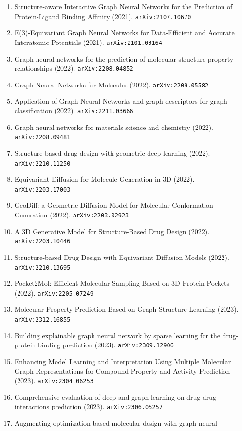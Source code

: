 \documentclass[11pt]{article}
\begin{document}
\begin{enumerate}
  \item Structure-aware Interactive Graph Neural Networks for the Prediction of
  Protein-Ligand Binding Affinity (2021). \texttt{arXiv:2107.10670}
  \item E(3)-Equivariant Graph Neural Networks for Data-Efficient and Accurate
  Interatomic Potentials (2021). \texttt{arXiv:2101.03164}
  \item Graph neural networks for the prediction of molecular structure-property
  relationships (2022). \texttt{arXiv:2208.04852}
  \item Graph Neural Networks for Molecules (2022). \texttt{arXiv:2209.05582}
  \item Application of Graph Neural Networks and graph descriptors for graph
  classification (2022). \texttt{arXiv:2211.03666}
  \item Graph neural networks for materials science and chemistry (2022). \texttt{arXiv:2208.09481}
  \item Structure-based drug design with geometric deep learning (2022). \texttt{arXiv:2210.11250}
  \item Equivariant Diffusion for Molecule Generation in 3D (2022). \texttt{arXiv:2203.17003}
  \item GeoDiff: a Geometric Diffusion Model for Molecular Conformation
  Generation (2022). \texttt{arXiv:2203.02923}
  \item A 3D Generative Model for Structure-Based Drug Design (2022). \texttt{arXiv:2203.10446}
  \item Structure-based Drug Design with Equivariant Diffusion Models (2022). \texttt{arXiv:2210.13695}
  \item Pocket2Mol: Efficient Molecular Sampling Based on 3D Protein Pockets (2022). \texttt{arXiv:2205.07249}
  \item Molecular Property Prediction Based on Graph Structure Learning (2023). \texttt{arXiv:2312.16855}
  \item Building explainable graph neural network by sparse learning for the
  drug-protein binding prediction (2023). \texttt{arXiv:2309.12906}
  \item Enhancing Model Learning and Interpretation Using Multiple Molecular
  Graph Representations for Compound Property and Activity Prediction (2023). \texttt{arXiv:2304.06253}
  \item Comprehensive evaluation of deep and graph learning on drug-drug
  interactions prediction (2023). \texttt{arXiv:2306.05257}
  \item Augmenting optimization-based molecular design with graph neural

\end{enumerate}
\end{document}

